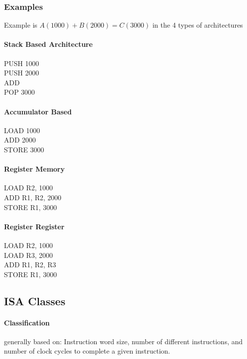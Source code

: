 \documentclass{article}
\newcommand\tab[1][0.5cm]{\hspace*{#1}}
\begin{document}
		\subsubsection{Examples}
			Example is $A(1000) + B(2000) = C(3000)$ in the 4 types of architectures
			
			\paragraph{\tab Stack Based Architecture\\}
					PUSH 1000 \\ \tab
					PUSH 2000 \\ \tab
					ADD \\ \tab
					POP 3000

			\paragraph{\tab Accumulator Based\\}
					LOAD 1000 \\ \tab
					ADD 2000 \\ \tab
					STORE 3000

			\paragraph{\tab Register Memory\\}
					LOAD R2, 1000 \\ \tab
					ADD R1, R2, 2000 \\ \tab
					STORE R1, 3000

			\paragraph{\tab Register Register\\}
					LOAD R2, 1000 \\ \tab
					LOAD R3, 2000 \\ \tab
					ADD R1, R2, R3 \\ \tab
					STORE R1, 3000


	\subsection{ISA Classes}
		\paragraph{Classification} generally based on: Instruction word size, number of different instructions, and number of clock cycles to complete a given instruction.
\end{document}
